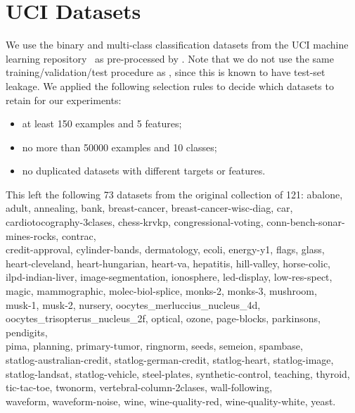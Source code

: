 
\section{UCI Datasets}\label{app:uci-datasets}

We use the binary and multi-class classification datasets from the UCI machine learning repository~\citep{dua2019uci} as pre-processed by \citet{delgado2014hundreds}.
Note that we do not use the same training/validation/test procedure as \citet{delgado2014hundreds}, since this is known to have test-set leakage.
We applied the following selection rules to decide which datasets to retain for our experiments:
\begin{itemize}
    \item at least 150 examples and 5 features;
    \item no more than 50000 examples and 10 classes;
    \item no duplicated datasets with different targets or features.
\end{itemize}
This left the following 73 datasets from the original collection of 121:
abalone,
adult,
annealing,
bank,
breast-cancer,
breast-cancer-wisc-diag,
car,
cardiotocography-3clases,
chess-krvkp,
congressional-voting,
conn-bench-sonar-mines-rocks,
contrac,\\
credit-approval,
cylinder-bands,
dermatology,
ecoli,
energy-y1,
flags,
glass,\\
heart-cleveland,
heart-hungarian,
heart-va,
hepatitis,
hill-valley,
horse-colic,\\
ilpd-indian-liver,
image-segmentation,
ionosphere,
led-display,
low-res-spect,\\
magic,
mammographic,
molec-biol-splice,
monks-2,
monks-3,
mushroom,\\
musk-1,
musk-2,
nursery,
oocytes\_merluccius\_nucleus\_4d,\\
oocytes\_trisopterus\_nucleus\_2f,
optical,
ozone,
page-blocks,
parkinsons,
pendigits,\\
pima,
planning,
primary-tumor,
ringnorm,
seeds,
semeion,
spambase,\\
statlog-australian-credit,
statlog-german-credit,
statlog-heart,
statlog-image,\\
statlog-landsat,
statlog-vehicle,
steel-plates,
synthetic-control,
teaching,
thyroid,\\
tic-tac-toe,
twonorm,
vertebral-column-2clases,
wall-following,\\
waveform,
waveform-noise,
wine,
wine-quality-red,
wine-quality-white,
yeast.

